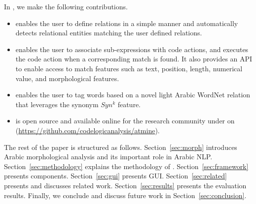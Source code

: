 In \framework, we make the following contributions.
\begin{itemize}
  \item \framework enables the user to define relations in a simple manner
    and automatically detects relational entities matching the user defined relations. 
  \item \framework enables the user to associate sub-expressions
    with code actions, and executes the code action 
    when a corresponding match is found.
    It also provides an API to enable access to match 
    features such as text, position, length, numerical value, and morphological features.
  \item \framework enables the user to tag words based on a novel light Arabic WordNet relation that leverages the synonym $Syn^k$ feature.
  \item \framework is open source and available online for the research community 
    under on (\url{https://github.com/codelogicanalysis/atmine}).
\end{itemize}

The rest of the paper is structured as follows.
Section~\ref{sec:morph} introduces Arabic morphological analysis 
and its important role in Arabic NLP.
Section~\ref{sec:methodology} explains the methodology of \framework.
Section~\ref{sec:framework} presents \framework components.
Section~\ref{sec:gui} presents \framework GUI. 
Section~\ref{sec:related} presents and discusses related work.
Section~\ref{sec:results} presents the evaluation results. 
Finally, we conclude and discuss future work in Section~\ref{sec:conclusion}.